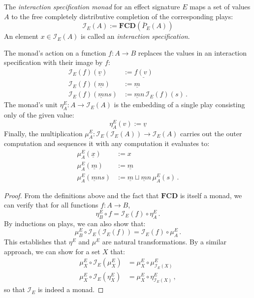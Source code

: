 \documentclass[sigplan,screen]{acmart}
\begin{document}
\begin{definition} \label{def:intm} %
The \emph{interaction specification monad}
for an effect signature $E$
maps a set of values $A$
to the free completely distributive completion
of the corresponding plays:
\[
    \mathcal{I}_E(A) :=
      \mathbf{FCD}(\bar{P}_E(A))
\]
An element $x \in \mathcal{I}_E(A)$ is called
an \emph{interaction specification}.

The monad's action on a function $f : A \rightarrow B$
replaces the values in
an interaction specification with their image by $f$:
\begin{align*}
  \mathcal{I}_E(f)(\underline{v}) &:= \underline{f(v)} \\
  \mathcal{I}_E(f)(\underline{m}) &:= \underline{m} \\
  \mathcal{I}_E(f)(\underline{m} n s) &:=
    \underline{m} n \, \mathcal{I}_E(f)(s) \,.
\end{align*}
The monad's unit
$\eta^E_A : A \rightarrow \mathcal{I}_E(A)$
is the embedding of a single play
consisting only of the given value:
\[
    \eta^E_A(v) := \underline{v}
\]
Finally, the multiplication
$\mu^E_A : \mathcal{I}_E(\mathcal{I}_E(A)) \rightarrow \mathcal{I}_E(A)$
carries out the outer computation and
sequences it with any computation it evaluates to:
\begin{align*}
  \mu^E_A(\underline{x}) &:= x \\
  \mu^E_A(\underline{m}) &:= \underline{m} \\
  \mu^E_A(\underline{m} n s) &:=
    \underline{m} \sqcup \underline{m} n \, \mu^E_A(s) \,.
\end{align*}

\begin{proof} %
From the definitions above and
the fact that $\mathbf{FCD}$ is itself a monad,
we can verify that
for all functions $f : A \rightarrow B$,
\[
    \eta^E_B \circ f = \mathcal{I}_E(f) \circ \eta^E_A \,.
\]
By inductions on plays, we can also show that:
\[
    \mu^E_B \circ \mathcal{I}_E(\mathcal{I}_E(f)) =
      \mathcal{I}_E(f) \circ \mu^E_A \,.
\]
This establishes that $\eta^E$ and $\mu^E$
are natural transformations.
By a similar approach,
we can show for a set $X$ that:
\begin{align*}
  \mu^E_X \circ \mathcal{I}_E(\mu^E_X) &=
    \mu^E_X \circ \mu^E_{\mathcal{I}_E(X)} \\
  \mu^E_X \circ \mathcal{I}_E(\eta^E_X) &=
    \mu^E_X \circ \eta^E_{\mathcal{I}_E(X)} \,,
\end{align*}
so that $\mathcal{I}_E$ is indeed a monad.
\end{proof}
\end{definition}
\end{document}
